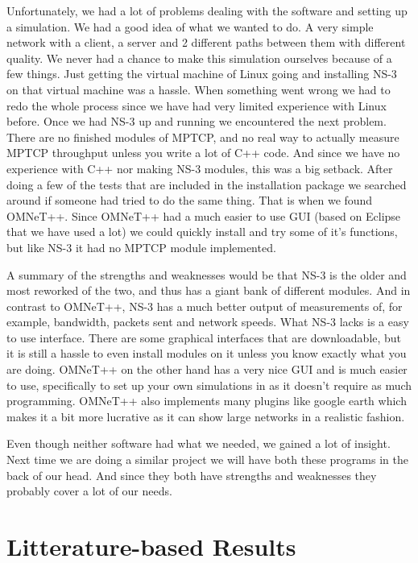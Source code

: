 \documentclass[11pt,twocolumn]{article}
\begin{document}
Unfortunately, we had a lot of problems dealing with the software and setting up a simulation. We had a good idea of what we wanted to do. A very simple network with a client, a server and 2 different paths between them with different quality. We never had a chance to make this simulation ourselves because of a few things. Just getting the virtual machine of Linux going and installing NS-3 on that virtual machine was a hassle. When something went wrong we had to redo the whole process since we have had very limited experience with Linux before. Once we had NS-3 up and running we encountered the next problem. There are no finished modules of MPTCP, and no real way to actually measure MPTCP throughput unless you write a lot of C++ code. And since we have no experience with C++ nor making NS-3 modules, this was a big setback. After doing a few of the tests that are included in the installation package we searched around if someone had tried to do the same thing. That is when we found OMNeT++. Since OMNeT++ had a much easier to use GUI (based on Eclipse that we have used a lot) we could quickly install and try some of it's functions, but like NS-3 it had no MPTCP module implemented. 

A summary of the strengths and weaknesses would be that NS-3 is the older and most reworked of the two, and thus has a giant bank of different modules. And in contrast to OMNeT++, NS-3 has a much better output of measurements of, for example, bandwidth, packets sent and network speeds. What NS-3 lacks is a easy to use interface. There are some graphical interfaces that are downloadable, but it is still a hassle to even install modules on it unless you know exactly what you are doing. OMNeT++ on the other hand has a very nice GUI and is much easier to use, specifically to set up your own simulations in as it doesn't require as much programming. OMNeT++ also implements many plugins like google earth which makes it a bit more lucrative as it can show large networks in a realistic fashion.

Even though neither software had what we needed, we gained a lot of insight. Next time we are doing a similar project we will have both these programs in the back of our head. And since they both have strengths and weaknesses they probably cover a lot of our needs.

\section{Litterature-based Results}
\end{document}
